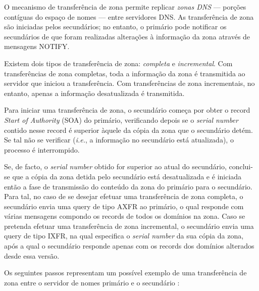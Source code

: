 

\noindent O mecanismo de transferência de zona permite replicar \emph{zonas DNS} --- porções contíguas do espaço de nomes --- entre servidores DNS. As transferência de zona são iniciadas pelos secundários; no entanto, o primário pode notificar os secundários de que foram realizadas alterações à informação da zona através de mensagens NOTIFY.

Existem dois tipos de transferência de zona: \emph{completa} e \emph{incremental}. Com transferências de zona completas, toda a informação da zona é transmitida ao servidor que iniciou a transferência. Com transferências de zona incrementais, no entanto, apenas a informação desatualizada é transmitida.

Para iniciar uma transferência de zona, o secundário começa por obter o record \emph{Start of Authority} (SOA) do primário, verificando depois se o \emph{serial number} contido nesse record é superior àquele da cópia da zona que o secundário detém. Se tal não se verificar (\emph{i.e.}, a informação no secundário está atualizada), o processo é interrompido.

Se, de facto, o \emph{serial number} obtido for superior ao atual do secundário, conclui-se que a cópia da zona detida pelo secundário está desatualizada e é iniciada então a fase de transmissão do conteúdo da zona do primário para o secundário. Para tal, no caso de se desejar efetuar uma transferência de zona completa, o secundário envia uma query de tipo AXFR ao primário, o qual responde com várias mensagens compondo os records de todos os domínios na zona. Caso se pretenda efetuar uma transferência de zona incremental, o secundário envia uma query de tipo IXFR, na qual especifica o \emph{serial number} da sua cópia da zona, após a qual o secundário responde apenas com os records dos domínios alterados desde essa versão.

Os seguintes passos representam um possível exemplo de uma transferência de zona entre o servidor de nomes primário  e o secundário :

